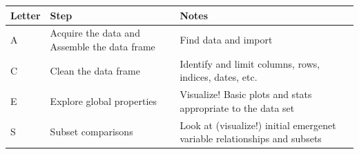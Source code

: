 \documentclass[]{book}
\begin{document}
\begin{longtable}[]{@{}lll@{}}
\toprule
\begin{minipage}[b]{0.26\columnwidth}\raggedright
Letter\strut
\end{minipage} & \begin{minipage}[b]{0.17\columnwidth}\raggedright
Step\strut
\end{minipage} & \begin{minipage}[b]{0.48\columnwidth}\raggedright
Notes\strut
\end{minipage}\tabularnewline
\midrule
\endhead
\begin{minipage}[t]{0.26\columnwidth}\raggedright
A\strut
\end{minipage} & \begin{minipage}[t]{0.17\columnwidth}\raggedright
Acquire the data and Assemble the data frame\strut
\end{minipage} & \begin{minipage}[t]{0.48\columnwidth}\raggedright
Find data and import\strut
\end{minipage}\tabularnewline
\begin{minipage}[t]{0.26\columnwidth}\raggedright
C\strut
\end{minipage} & \begin{minipage}[t]{0.17\columnwidth}\raggedright
Clean the data frame\strut
\end{minipage} & \begin{minipage}[t]{0.48\columnwidth}\raggedright
Identify and limit columns, rows, indices, dates, etc.\strut
\end{minipage}\tabularnewline
\begin{minipage}[t]{0.26\columnwidth}\raggedright
E\strut
\end{minipage} & \begin{minipage}[t]{0.17\columnwidth}\raggedright
Explore global properties\strut
\end{minipage} & \begin{minipage}[t]{0.48\columnwidth}\raggedright
Visualize! Basic plots and stats appropriate to the data set\strut
\end{minipage}\tabularnewline
\begin{minipage}[t]{0.26\columnwidth}\raggedright
S\strut
\end{minipage} & \begin{minipage}[t]{0.17\columnwidth}\raggedright
Subset comparisons\strut
\end{minipage} & \begin{minipage}[t]{0.48\columnwidth}\raggedright
Look at (visualize!) initial emergenet variable relationships and subsets\strut
\end{minipage}\tabularnewline
\bottomrule
\end{longtable}
\end{document}
